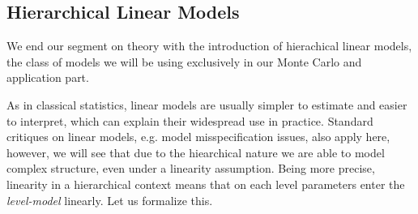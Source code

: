 %

\subsection{Hierarchical Linear Models}
We end our segment on theory with the introduction of hierachical linear models, the class of models we will be using exclusively in our Monte Carlo and application part.

As in classical statistics, linear models are usually simpler to estimate and easier to interpret, which can explain their widespread use in practice.
Standard critiques on linear models, e.g. model misspecification issues, also apply here, however, we will see that due to the hiearchical nature we are able to model complex structure, even under a linearity assumption.
Being more precise, linearity in a hierarchical context means that on each level parameters enter the \emph{level-model} linearly.
Let us formalize this.

